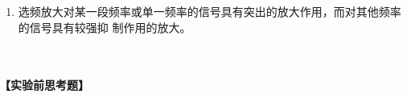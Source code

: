 \documentclass[11pt,a4paper]{ctexart}
\newcommand{\emptyline}{\par \ \\ }
\begin{document}
\begin{enumerate}
流增益，降低交流增益，则动态储备提高，使锁相放大器具有良好的抗干扰能力，但以输出
稳定性为代价，降低了测量精度。\par
在确定的测量精度要求下，动态储备有最小值。精度要求越高，其最小值就越大。在模
拟锁相放大器中，低动态储备意味着更小的输出误差和漂移。在 OE1022 数字锁放中，高动
态储备不会增加输出误差和漂移，但是会增加输出噪声。然而，如果在 A/D 转换器前的模
拟放大器增益足够大，则其被放大的自身噪声比 A/D 转换器的噪声还大。这样，输出主要
受输入噪声影响。因此，增大模拟增益即减小动态储备并不能减小输出噪声。在分辨率要求极高的情况下，增益增大并不能提高信噪比，因此，这时可以降低增益从而提高动态储备\cite{lec}。
\item 
 选频放大对某一段频率或单一频率的信号具有突出的放大作用，而对其他频率的信号具有较强抑
 制作用的放大。
 \end{enumerate}
\emptyline
\\
\textbf{【实验前思考题】}
\end{document}
